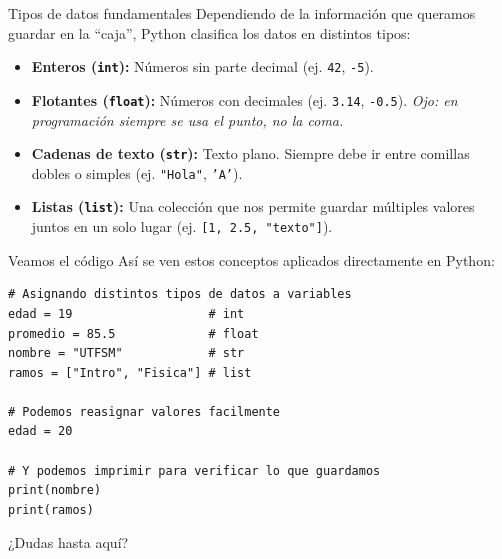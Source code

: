 \documentclass[aspectratio=169, 11pt]{beamer}
\begin{document}
	\begin{frame}{Tipos de datos fundamentales}
		Dependiendo de la información que queramos guardar en la ``caja'', Python clasifica los datos en distintos tipos:
		\begin{itemize}
			\item \textbf{Enteros (\texttt{int}):} Números sin parte decimal (ej. \texttt{42}, \texttt{-5}).
			\item \textbf{Flotantes (\texttt{float}):} Números con decimales (ej. \texttt{3.14}, \texttt{-0.5}). \textit{Ojo: en programación siempre se usa el punto, no la coma.}
			\item \textbf{Cadenas de texto (\texttt{str}):} Texto plano. Siempre debe ir entre comillas dobles o simples (ej. \texttt{"Hola"}, \texttt{'A'}).
			\item \textbf{Listas (\texttt{list}):} Una colección que nos permite guardar múltiples valores juntos en un solo lugar (ej. \texttt{[1, 2.5, "texto"]}).
		\end{itemize}
	\end{frame}
	
	\begin{frame}[fragile]{Veamos el código}
		Así se ven estos conceptos aplicados directamente en Python:
		
		\begin{lstlisting}
# Asignando distintos tipos de datos a variables
edad = 19                   # int
promedio = 85.5             # float
nombre = "UTFSM"            # str
ramos = ["Intro", "Fisica"] # list

# Podemos reasignar valores facilmente
edad = 20

# Y podemos imprimir para verificar lo que guardamos
print(nombre)
print(ramos)
\end{lstlisting}
	\end{frame}
	
	\begin{frame}[standout]
		¿Dudas hasta aquí?
	\end{frame}
	
\end{document}

